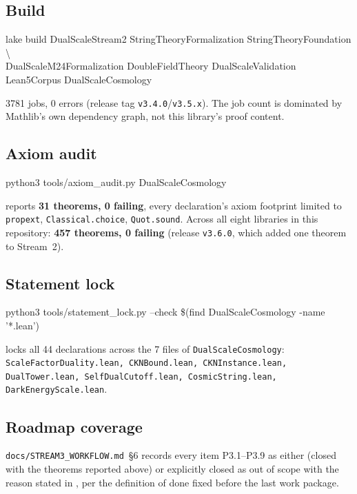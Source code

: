 \documentclass[11pt,a4paper]{article}
\theoremstyle{remark}
\begin{document}
\subsection{Build}
\begin{center}
\footnotesize\ttfamily
lake build DualScaleStream2 StringTheoryFormalization StringTheoryFoundation \textbackslash\\
  DualScaleM24Formalization DoubleFieldTheory DualScaleValidation Lean5Corpus DualScaleCosmology
\end{center}
3781 jobs, 0 errors (release tag \texttt{v3.4.0}/\texttt{v3.5.x}). The job count is dominated by
Mathlib's own dependency graph, not this library's proof content.

\subsection{Axiom audit}
\begin{center}
\footnotesize\ttfamily
python3 tools/axiom\_audit.py DualScaleCosmology
\end{center}
reports \textbf{31 theorems, 0 failing}, every declaration's axiom footprint limited to
\texttt{propext}, \texttt{Classical.choice}, \texttt{Quot.sound}. Across all eight libraries in
this repository: \textbf{457 theorems, 0 failing} (release \texttt{v3.6.0}, which added one theorem to Stream~2).

\subsection{Statement lock}
\begin{center}
\footnotesize\ttfamily
python3 tools/statement\_lock.py --check \$(find DualScaleCosmology -name '*.lean')
\end{center}
locks all 44 declarations across the 7 files of \texttt{DualScaleCosmology}:
{\small\texttt{ScaleFactorDuality.lean, CKNBound.lean, CKNInstance.lean, DualTower.lean,
SelfDualCutoff.lean, CosmicString.lean, DarkEnergyScale.lean}}.

\subsection{Roadmap coverage}
\texttt{docs/STREAM3\_WORKFLOW.md}~\S6 records every item P3.1--P3.9 as either \checkmark{}
(closed with the theorems reported above) or explicitly closed as out of scope with the reason
stated in , per the definition of done fixed before the last work package.
\end{document}
